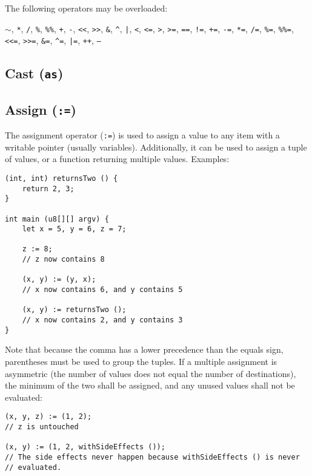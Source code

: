 \documentclass{article}
\begin{document}
The following operators may be overloaded:

\texttt{$\sim$},
\texttt{*},
\texttt{/},
\texttt{\%},
\texttt{\%\%},
\texttt{+},
\texttt{-},
\texttt{<<},
\texttt{>>},
\texttt{\&},
\texttt{\^},
\texttt{|},
\texttt{<},
\texttt{<=},
\texttt{>},
\texttt{>=},
\texttt{==},
\texttt{!=},
\texttt{+=},
\texttt{-=},
\texttt{*=},
\texttt{/=},
\texttt{\%=},
\texttt{\%\%=},
\texttt{<<=},
\texttt{>>=},
\texttt{\&=},
\texttt{\^{}=},
\texttt{|=},
\texttt{++},
\texttt{--}

\subsection{Cast (\texttt{as})}
\label{sub:operators:cast}

\subsection{Assign (\texttt{:=})}
\label{sub:operators:assign}
The assignment operator (\texttt{:=}) is used to assign a value to any item with
a writable pointer (usually variables). Additionally, it can be used to assign
a tuple of values, or a function returning multiple values.
Examples:
\begin{verbatim}
(int, int) returnsTwo () {
    return 2, 3;
}

int main (u8[][] argv) {
    let x = 5, y = 6, z = 7;

    z := 8;
    // z now contains 8

    (x, y) := (y, x);
    // x now contains 6, and y contains 5

    (x, y) := returnsTwo ();
    // x now contains 2, and y contains 3
}
\end{verbatim}

Note that because the comma has a lower precedence than the equals sign,
parentheses must be used to group the tuples. If a multiple assignment is
asymmetric (the number of values does not equal the number of destinations),
the minimum of the two shall be assigned, and any unused values shall not be
evaluated:
\begin{verbatim}
(x, y, z) := (1, 2);
// z is untouched

(x, y) := (1, 2, withSideEffects ());
// The side effects never happen because withSideEffects () is never
// evaluated.
\end{verbatim}
\end{document}
